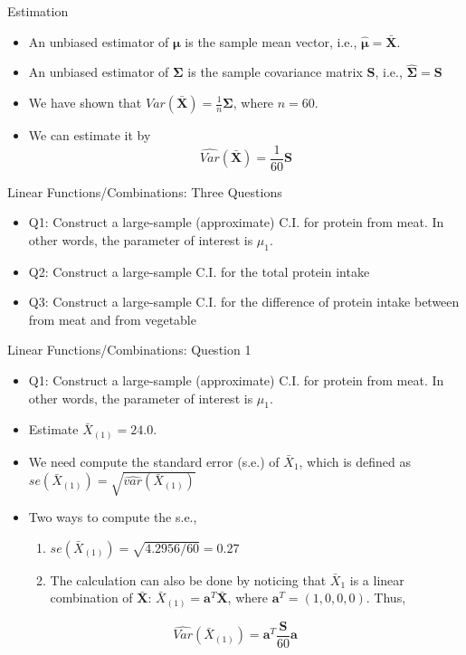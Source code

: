 \documentclass[
  ignorenonframetext,
]{beamer}
\providecommand{\tightlist}{%
  \setlength{\itemsep}{0pt}\setlength{\parskip}{0pt}}
\begin{document}
\begin{frame}{Estimation}
\protect\hypertarget{estimation}{}
\begin{itemize}
\tightlist
\item
  An unbiased estimator of \(\boldsymbol\mu\) is the sample mean vector,
  i.e., \(\hat{\boldsymbol \mu}=\bar{\mathbf X}\).
\item
  An unbiased estimator of \(\boldsymbol \Sigma\) is the sample
  covariance matrix \(\mathbf S\), i.e.,
  \(\hat{\boldsymbol \Sigma}=\mathbf S\)
\item
  We have shown that
  \(Var(\bar{\mathbf X})=\frac{1}{n}\boldsymbol \Sigma\), where
  \(n=60\).
\item
  We can estimate it by
  \[\hat{Var}(\bar{\mathbf X})=\frac{1}{60}\mathbf S\]
\end{itemize}
\end{frame}

\begin{frame}{Linear Functions/Combinations: Three Questions}
\protect\hypertarget{linear-functionscombinations-three-questions}{}
\begin{itemize}
\item
  Q1: Construct a large-sample (approximate) C.I. for protein from meat.
  In other words, the parameter of interest is \(\mu_1\).
\item
  Q2: Construct a large-sample C.I. for the total protein intake
\item
  Q3: Construct a large-sample C.I. for the difference of protein intake
  between from meat and from vegetable
\end{itemize}
\end{frame}

\begin{frame}{Linear Functions/Combinations: Question 1}
\protect\hypertarget{linear-functionscombinations-question-1}{}
\begin{itemize}
\tightlist
\item
  Q1: Construct a large-sample (approximate) C.I. for protein from meat.
  In other words, the parameter of interest is \(\mu_1\).
\item
  Estimate \(\bar X_{(1)}=24.0\).
\item
  We need compute the standard error (s.e.) of \(\bar X_1\), which is
  defined as \(se(\bar X_{(1)})=\sqrt{\hat{var}(\bar X_{(1)})}\)
\item
  Two ways to compute the s.e.,

  \begin{enumerate}
  \tightlist
  \item
    \(se(\bar X_{(1)})=\sqrt{4.2956/60}=0.27\)
  \item
    The calculation can also be done by noticing that \(\bar X_1\) is a
    linear combination of \(\bar{\mathbf X}\):
    \(\bar X_{(1)} =\mathbf a^T \bar{\mathbf X}\), where
    \(\mathbf a^T=(1, 0, 0, 0)\). Thus,
  \end{enumerate}
\end{itemize}

\[\hat{Var}(\bar X_{(1)})=\mathbf a^T \frac{\mathbf S}{60} \mathbf a\]
\end{frame}
\end{document}
